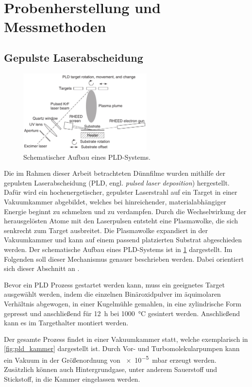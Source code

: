 \section{Probenherstellung und Messmethoden}\label{sec:messmethoden}

\subsection{Gepulste Laserabscheidung}\label{subsec:pld}
\begin{figure}
    \centering
    \includegraphics[width=0.6\textwidth]{../assets/messmethoden/pld/aufbau}
    \caption{Schematischer Aufbau eines PLD-Systems. }
    \label{fig:pld}
\end{figure}
Die im Rahmen dieser Arbeit betrachteten Dünnfilme wurden mithilfe der gepulsten Laserabscheidung
(PLD, engl. \textit{pulsed laser deposition}) hergestellt.
Dafür wird ein hochenergetischer, gepulster Laserstrahl auf ein Target in einer Vakuumkammer abgebildet, welches bei
hinreichender, materialabhängiger Energie beginnt zu schmelzen und zu verdampfen.
Durch die Wechselwirkung der herausgelösten Atome mit den Laserpulsen entsteht eine Plasmawolke, die sich senkrecht
zum Target ausbreitet.
Die Plasmawolke expandiert in der Vakuumkammer und kann auf einem passend platzierten Substrat abgeschieden werden.
Der schematische Aufbau eines PLD-Systems ist in \cref{fig:pld} dargestellt.
Im Folgenden soll dieser Mechanismus genauer beschrieben werden.
Dabei orientiert sich dieser Abschnitt an  \autocite{Lorenz2019}.

Bevor ein PLD Prozess gestartet werden kann, muss ein geeignetes Target ausgewählt werden,
indem die einzelnen Binäroxidpulver im äquimolaren Verhältnis abgewogen, in einer Kugelmühle gemahlen,
in eine zylindrische Form gepresst und anschließend für \qty{12}{\hour} bei \qty{1000}{\celsius} gesintert werden.
Anschließend kann es im Targethalter montiert werden.

Der gesamte Prozess findet in einer Vakuumkammer statt, welche exemplarisch in \cref{fig:pld_kammer} dargestellt ist.
Durch Vor- und Turbomolekularpumpen kann ein Vakuum in der Größenordnung von \qty{e-5}{\milli\bar} erzeugt werden.
Zusätzlich können auch Hintergrundgase, unter anderem Sauerstoff und Stickstoff, in die Kammer eingelassen werden.

